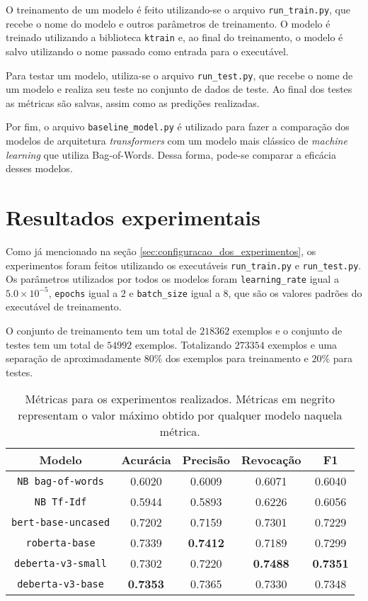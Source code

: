 O treinamento de um modelo é feito utilizando-se o arquivo
\texttt{run\_train.py}, que recebe o nome do modelo e outros parâmetros de
treinamento. O modelo é treinado utilizando a biblioteca \texttt{ktrain} e, ao
final do treinamento, o modelo é salvo utilizando o nome passado como entrada
para o executável.

Para testar um modelo, utiliza-se o arquivo \texttt{run\_test.py}, que recebe o
nome de um modelo e realiza seu teste no conjunto de dados de teste. Ao final
dos testes as métricas são salvas, assim como as predições realizadas.

Por fim, o arquivo \texttt{baseline\_model.py} é utilizado para fazer a
comparação dos modelos de arquitetura \textit{transformers} com um modelo mais
clássico de \textit{machine learning} que utiliza Bag-of-Words. Dessa forma,
pode-se comparar a eficácia desses modelos.

\section{Resultados experimentais}%
\label{sec:resultados_experimentais}

Como já mencionado na seção \ref{sec:configuracao_dos_experimentos}, os
experimentos foram feitos utilizando os executáveis \texttt{run\_train.py} e
\texttt{run\_test.py}. Os parâmetros utilizados por todos os modelos foram
\texttt{learning\_rate} igual a $5.0\times 10^{-5}$, \texttt{epochs} igual a
$2$ e \texttt{batch\_size} igual a $8$, que são os valores padrões do executável
de treinamento.

O conjunto de treinamento tem um total de $218362$ exemplos e o conjunto de
testes tem um total de $54992$ exemplos. Totalizando $273354$ exemplos e uma
separação de aproximadamente $80\%$ dos exemplos para treinamento e $20\%$ para
testes.

\begin{table}[h]
\centering
\caption{Métricas para os experimentos realizados. Métricas em negrito
   representam o valor máximo obtido por qualquer modelo naquela métrica.}
\label{tab:experiments}
\begin{tabular}{c | c c c c}
   \textbf{Modelo} & \textbf{Acurácia} & \textbf{Precisão} & \textbf{Revocação}
                  & \textbf{F1} \\ \hline \hline
   \texttt{NB bag-of-words} & 0.6020 & 0.6009 & 0.6071 & 0.6040 \\
   \texttt{NB Tf-Idf} & 0.5944 & 0.5893 & 0.6226 & 0.6056 \\ \hline
   \texttt{bert-base-uncased} & 0.7202 & 0.7159 & 0.7301 & 0.7229 \\
   \texttt{roberta-base} & 0.7339 & \textbf{0.7412} & 0.7189 & 0.7299 \\
   \texttt{deberta-v3-small} & 0.7302 & 0.7220 & \textbf{0.7488} & \textbf{0.7351} \\
   \texttt{deberta-v3-base} & \textbf{0.7353} & 0.7365 & 0.7330 & 0.7348 \\ \hline
\end{tabular}
\end{table}

